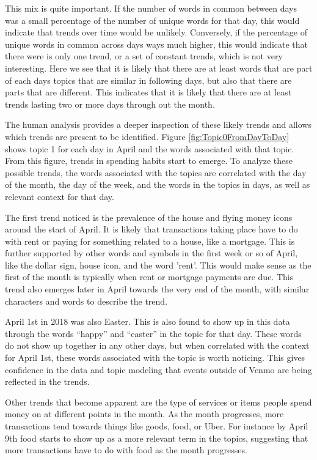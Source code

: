 \documentclass[conference]{IEEEtran}
\begin{document}
This mix is quite important. If the number of words in common between days was a small percentage of the number of unique words for that day, this would indicate that trends over time would be unlikely. Conversely, if the percentage of unique words in common across days ways much higher, this would indicate that there were is only one trend, or a set of constant trends, which is not very interesting. Here we see that it is likely that there are at least words that are part of each days topics that are similar in following days, but also that there are parts that are different. This indicates that it is likely that there are at least trends lasting two or more days through out the month. 

The human analysis provides a deeper inspection of these likely trends and allows which trends are present to be identified. Figure \ref{fig:Topic0FromDayToDay} shows topic 1 for each day in April and the words associated with that topic. From this figure, trends in spending habits start to emerge. To analyze these possible trends, the words associated with the topics are correlated with the day of the month, the day of the week, and the words in the topics in days, as well as relevant context for that day. 

The first trend noticed is the prevalence of the house and flying money icons around the start of April. It is likely that transactions taking place have to do with rent or paying for something related to a house, like a mortgage. This is further supported by other words and symbols in the first week or so of April, like the dollar sign, house icon, and the word 'rent'. This would make sense as the first of the month is typically when rent or mortgage payments are due. This trend also emerges later in April towards the very end of the month, with similar characters and words to describe the trend. 

April 1st in 2018 was also Easter. This is also found to show up in this data through the words ``happy'' and ``easter'' in the topic for that day. These words do not show up together in any other days, but when correlated with the context for April 1st, these words associated with the topic is worth noticing. This gives confidence in the data and topic modeling that events outside of Venmo are being reflected in the trends. 

Other trends that become apparent are the type of services or items people spend money on at different points in the month. As the month progresses, more transactions tend towards things like goods, food, or Uber. For instance by April 9th food starts to show up as a more relevant term in the topics, suggesting that more transactions have to do with food as the month progresses. 
\end{document}
